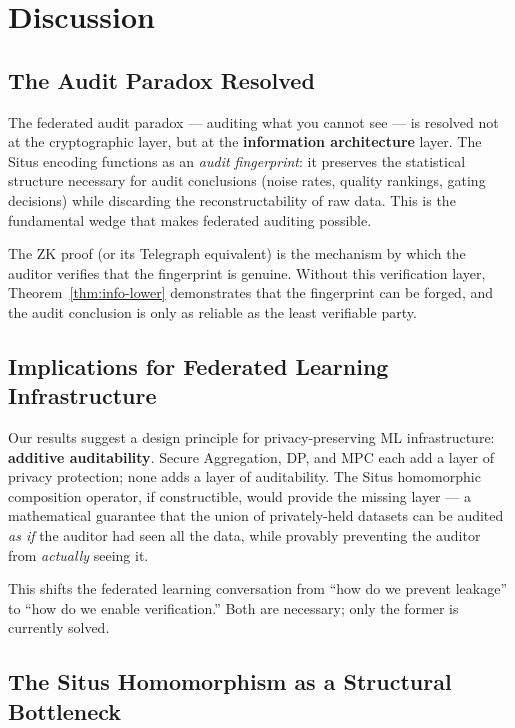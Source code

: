 \documentclass[12pt,a4paper]{article}
\newcommand{\ZK}{\mathrm{ZK}}
\begin{document}
\section{Discussion}

\subsection{The Audit Paradox Resolved}

The federated audit paradox — auditing what you cannot see — is resolved not
at the cryptographic layer, but at the \textbf{information architecture}
layer.  The Situs encoding functions as an \emph{audit fingerprint}: it
preserves the statistical structure necessary for audit conclusions (noise
rates, quality rankings, gating decisions) while discarding the
reconstructability of raw data.  This is the fundamental wedge that makes
federated auditing possible.

The $\ZK$ proof (or its Telegraph equivalent) is the mechanism by which the
auditor verifies that the fingerprint is genuine.  Without this verification
layer, Theorem~\ref{thm:info-lower} demonstrates that the fingerprint can
be forged, and the audit conclusion is only as reliable as the least
verifiable party.

\subsection{Implications for Federated Learning Infrastructure}

Our results suggest a design principle for privacy-preserving ML
infrastructure: \textbf{additive auditability}.  Secure Aggregation, DP, and
MPC each add a layer of privacy protection; none adds a layer of
auditability.  The Situs homomorphic composition operator, if constructible,
would provide the missing layer — a mathematical guarantee that the union of
privately-held datasets can be audited \emph{as if} the auditor had seen
all the data, while provably preventing the auditor from \emph{actually}
seeing it.

This shifts the federated learning conversation from ``how do we prevent
leakage'' to ``how do we enable verification.''  Both are necessary; only
the former is currently solved.

\subsection{The Situs Homomorphism as a Structural Bottleneck}
\end{document}
